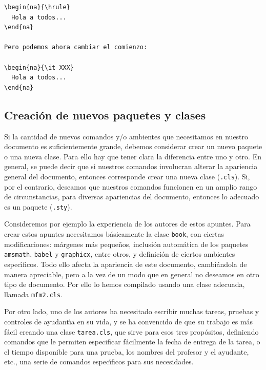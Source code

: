 {{\begin{minipage}[t]{5cm}
\begin{verbatim}
\begin{na}{\hrule}
  Hola a todos...
\end{na}

Pero podemos ahora cambiar el comienzo:

\begin{na}{\it XXX}
  Hola a todos...
\end{na}
\end{verbatim}
\end{minipage}
}
\vspace{.3cm}


\subsection{Creaci\'on de nuevos paquetes y clases}

Si la cantidad de nuevos comandos y/o ambientes que necesitamos en
nuestro documento es suficientemente grande, debemos considerar crear un nuevo
paquete o una nueva clase. Para ello hay que tener clara la diferencia
entre uno y otro. En general, se puede decir que si nuestros comandos
involucran alterar la apariencia general del documento, entonces
corresponde crear una nueva clase (\verb+.cls+). 
Si, por el contrario, deseamos que
nuestros comandos funcionen en un amplio rango de circunstancias, para
diversas apariencias del documento, entonces lo adecuado es un paquete
(\verb+.sty+).

Consideremos por ejemplo la experiencia de los autores de estos
apuntes. Para crear estos apuntes necesitamos b\'asicamente la clase
\verb+book+, con ciertas modificaciones: m\'argenes m\'as peque\~nos,
inclusi\'on autom\'atica de los paquetes \verb+amsmath+, \verb+babel+
y \verb+graphicx+, entre otros, y definici\'on de ciertos ambientes
espec\'{\i}ficos. Todo ello afecta la apariencia
de este documento, cambi\'andola de manera apreciable, pero a la vez
de un modo que en general no deseamos en otro tipo de documento. 
Por ello lo hemos compilado
usando una clase adecuada, llamada \verb+mfm2.cls+. 

Por otro lado, uno de los autores ha necesitado escribir muchas
tareas, pruebas y controles de ayudant\'{\i}a en su vida, y se ha
convencido de que su trabajo es m\'as f\'acil creando una clase
\verb+tarea.cls+, que sirve para esos tres prop\'ositos, definiendo
comandos que le permiten especificar f\'acilmente la fecha de entrega
de la tarea, o el tiempo disponible para una prueba, los nombres del
profesor y el ayudante, etc., una serie de comandos espec\'{\i}ficos
para sus necesidades. 

}
